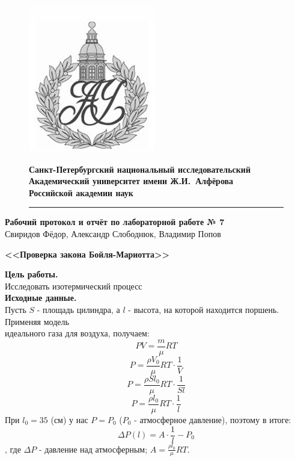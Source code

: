 \documentclass[a4paper]{article}
\begin{document}
	\begin{figure}[htb]
		\begin{minipage}[c]{0.12\textwidth}
			\includegraphics[scale=0.25]{AU}
		\end{minipage}
		\hfill
		\begin{minipage}[t]{0.9\textwidth}
			{\Large\bfseries Санкт-Петербургский национальный исследовательский Академический университет имени Ж.И.~Алфёрова\\Российской академии наук}
		\end{minipage}
		\rule{164mm}{0.3mm}
	\end{figure}
	
	\begin{center}
		{\large\textbf{Рабочий протокол и отчёт по лабораторной работе № 7}}\\
		Свиридов Фёдор, Александр Слободнюк, Владимир Попов
	\end{center}
	\begin{center}
		\Large\bfseries{<<Проверка закона Бойля-Мариотта>>}\\
	\end{center}
	
	{\parindent=0pt\textbf{Цель работы.}}\\
	Исследовать изотермический процесс\\
	
	{\parindent=0pt\textbf{Исходные данные.}}\\
	Пусть $S$ - площадь цилиндра, а $l$ - высота, на которой находится поршень. Применяя модель\\ идеального газа для воздуха, получаем:
	$$ PV=\frac{m}{\mu} RT$$
	$$ P=\frac{\rho V_0}{\mu}RT\cdot\frac{1}{V}$$
	$$ P=\frac{\rho S l_0}{\mu}RT\cdot\frac{1}{S l}$$
	$$ P=\frac{\rho  l_0}{\mu}RT\cdot\frac{1}{ l}$$
	При $l_0=35$ (см) у нас $P=P_0$ ($P_0$ - атмосферное давление), поэтому в итоге:
	$$\Delta P(l)=A\cdot \frac{1}{l} - P_0$$
	, где $\Delta P$ - давление над атмосферным; $A = \frac{\rho  l_0}{\mu}RT$.\\
	\parindent=0pt
	
\end{document}
